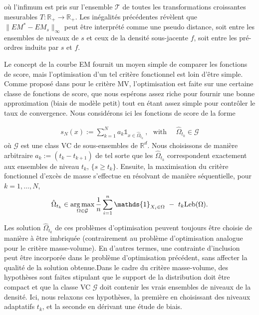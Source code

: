 \documentclass[a4paper, 12pt]{article}
\def\rset{\mathbb{R}}
\def\leb{\text{Leb}}
\def\argmax{\operatornamewithlimits{arg\,max}}
\begin{document}
où l'infimum est pris sur l'ensemble $ \mathcal {T} $ de toutes les transformations croissantes mesurables $T: \mathbb {R} _ + \rightarrow \mathbb {R} _ + $.
Les inégalités précédentes révèlent que $ \| EM ^ * - EM_s \| _ \infty $ peut être interprété comme une pseudo distance, soit entre les ensembles de niveaux de $ s $ et ceux de la densité sous-jacente $ f $, soit entre les pré-ordres induits par $ s $ et $ f $.

Le concept de la courbe EM fournit un moyen simple de comparer les fonctions de score, mais l'optimisation d'un tel critère fonctionnel est loin d'être simple. Comme proposé dans \cite {CLEM13} pour le critère MV, l'optimisation est faite sur une certaine classe de fonctions de score, que nous espérons assez riche pour fournir une bonne approximation (biais de modèle petit) tout en étant assez simple pour contrôler le taux de convergence. Nous considérons ici les fonctions de score de la forme

\begin{align*}
s_N(x):= \sum_{k=1}^N a_k \mathds{1}_{x \in \hat{\Omega}_{t_k} }~, ~~~\text{with ~~~} \hat{\Omega}_{t_k}  \in \mathcal{G}
\end{align*}
où $\mathcal{G}$ est une class VC de sous-ensembles de $\rset^d$.
Nous choisissons de manière arbitraire $a_k:= (t_k-t_{k+1})$ de tel sorte que les $\hat{\Omega}_{t_k}$ correspondent exactement aux ensembles de niveau $t_k$, $\{s \ge t_k\}$. Ensuite, la maximisation du critère fonctionnel d'excès de masse s'effectue en résolvant de manière séquentielle, pour $k=1,\ldots,N$,
\begin{align*}
\hat \Omega_{t_k} \in \argmax_{\Omega \in \mathcal{G}} \frac{1}{n}\sum_{i=1}^n\mathds{1}_{X_i \in \Omega}~-~t_k \leb(\Omega).
\end{align*}

Les solution $ \hat \Omega_ {t_k} $ de ces problèmes d'optimisation peuvent toujours être choisie de manière à être imbriquée (contrairement au problème d'optimisation analogue pour le critère masse-volume). En d'autres termes, une contrainte d'inclusion peut être incorporée dans le problème d'optimisation précédent, sans affecter la qualité de la solution obtenue.Dans le cadre du critère masse-volume, des hypothèses sont faites stipulant que le support de la distribution doit être compact et que la classe VC $ \mathcal {G} $ doit contenir les vrais ensembles de niveaux de la densité. Ici, nous relaxons ces hypothèses, la première en choisissant des niveaux adaptatifs $ t_k $, et la seconde en dérivant une étude de biais. %
\end{document}
